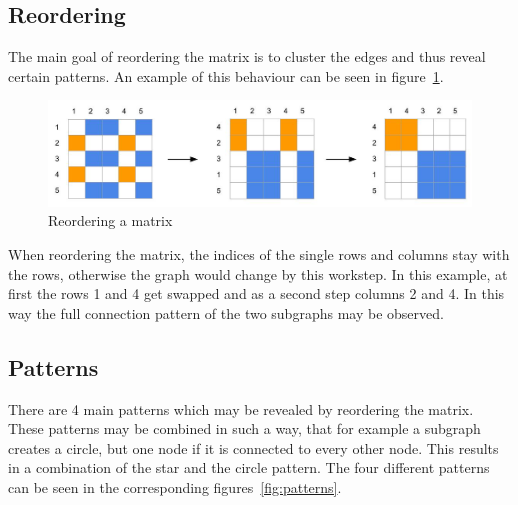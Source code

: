 \subsection{Reordering}

The main goal of reordering the matrix is to cluster the edges and thus reveal certain patterns. An example of this behaviour can be seen in figure~\ref{fig:reorder}. 

\begin{figure}[h]
\includegraphics[width=\textwidth]{images/reorder}
\caption{Reordering a matrix\label{fig:reorder}}
\end{figure}


When reordering the matrix, the indices of the single rows and columns stay with the rows, otherwise the graph would change by this workstep. In this example, at first the rows 1 and 4 get swapped and as a second step columns 2 and 4. In this way the full connection pattern of the two subgraphs may be observed. 

\subsection{Patterns}
There are 4 main patterns which may be revealed by reordering the matrix. These patterns may be combined in such a way, that for example a subgraph creates a circle, but one node if it is connected to every other node. This results in a combination of the star and the circle pattern. 
The four different patterns can be seen in the corresponding figures~\ref{fig:patterns}.

